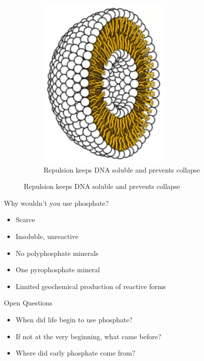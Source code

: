 \documentclass[]{article}
\begin{document}
\begin{figure}[H]
	\begin{subfigure}[b]{0.45\textwidth}
		\centering
		\caption{Repulsion keeps DNA soluble and prevents collapse}\label{fig:PhosphoLipid3} 
		\includegraphics[width=\textwidth]{PhosphoLipid3}
	\end{subfigure}
	
\end{figure}

Why wouldn't you use phosphate?

\begin{itemize}
	\item Scarce
	\item Insoluble, unreactive
	\item No polyphosphate minerals
	\item One pyrophosphate mineral
	\item Limited geochemical production of reactive forms
\end{itemize}
Open Questions

\begin{itemize}
	\item When did life begin to use 	phosphate?
	\item If not at the very beginning, what 	came before?
	\item Where did early phosphate come 	from?
\end{itemize}
\end{document}

